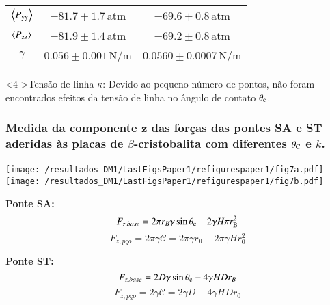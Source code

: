 \documentclass[8pt]{beamer}
\begin{document}
\begin{frame}
\begin{minipage}{0.48\textwidth}
\begin{block}
{\begin{center}
{\begin{tabular}{ccc}
					$\left \langle P_{\rm yy} \right \rangle$ & $-81.7\pm1.7$\,atm   &  $-69.6\pm0.8$\,atm \\
					$\left \langle P_{\rm zz} \right \rangle$ & $-81.9\pm1.4$\,atm   &  $-69.2\pm0.8$\,atm \\
							$\gamma$                          & $0.056\pm0.001$\,N/m &  $0.0560\pm0.0007$\,N/m\\
				\end{tabular}
			   } %
			\end{center}
			}
		\end{block}
		\begin{block}<4->{\small Tensão de linha $\kappa$:}
			{\small Devido ao pequeno número de pontos, não foram encontrados efeitos da tensão de linha no ângulo de contato $\theta_{\rm c}$.}
		\end{block}
	\end{minipage}
\end{frame}

\begin{frame}
	\frametitle{\textbf{Medida da componente $\mathbf{z}$ das forças} das pontes SA e ST aderidas às placas de $\beta$-cristobalita com diferentes $\theta_{\rm C}$ e $k$.}
	\begin{center}	
		\texttt{[image: /resultados\_DM1/LastFigsPaper1/refigurespaper1/fig7a.pdf]}~~   
		\texttt{[image: /resultados\_DM1/LastFigsPaper1/refigurespaper1/fig7b.pdf]}\\
	\end{center}
	\vspace{0.5cm}
	\begin{minipage}{0.49\textwidth}
		\begin{center}
		  \textbf{Ponte SA:}\\
		  $$F_{z,base} = 2\pi r_B\gamma\sin\theta_{\rm c} - 2\gamma H\pi r^2_{\rm B}$$
		  $$F_{z,p\text{ç}o} = 2\pi\gamma \mathcal C = 2\pi\gamma r_0 - 2\pi\gamma H r_0^2$$
		\end{center}
	\end{minipage}
	\begin{minipage}{0.49\textwidth}
		\begin{center}
		  \textbf{Ponte ST:}\\
		  $$F_{z,base} = 2 D\gamma\sin\theta_{\rm c} - 4\gamma H D r_B$$
		  $$F_{z,p\text{ç}o} = 2 \gamma \mathcal C = 2 \gamma D - 4\gamma H D r_0$$
		\end{center}
	\end{minipage}
\end{frame}
\end{document}
